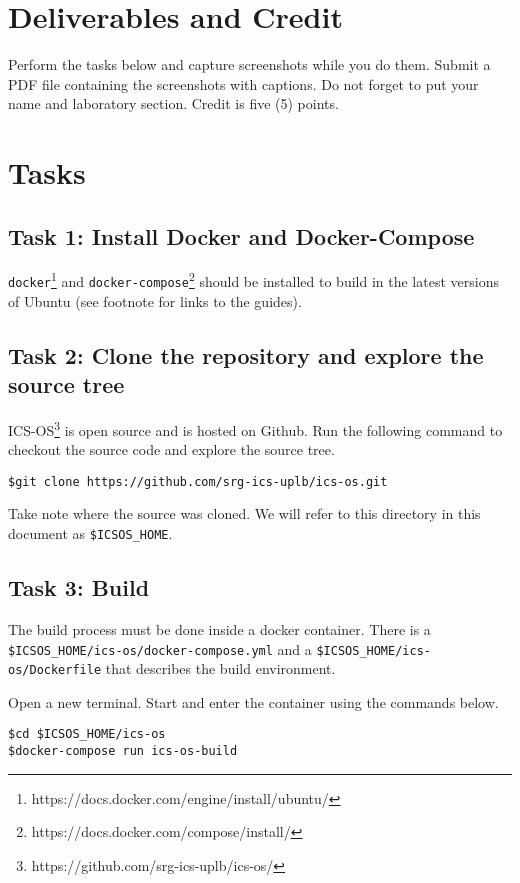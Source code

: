\documentclass[a4paper, 11pt,oneside]{article}
\begin{document}
\section{Deliverables and Credit}
Perform the tasks below and capture screenshots while you do them. Submit a PDF 
file containing the screenshots with captions. Do not forget to put your name 
and laboratory section. Credit is five (5) points.

\section{Tasks}

\subsection*{Task 1: Install Docker and Docker-Compose}
\texttt{docker}\footnote{https://docs.docker.com/engine/install/ubuntu/} and 
\texttt{docker-compose}\footnote{https://docs.docker.com/compose/install/} 
should be installed to build in the latest versions of Ubuntu (see footnote for 
links to the guides). 


\subsection*{Task 2: Clone the repository and explore the source tree}
ICS-OS\footnote{https://github.com/srg-ics-uplb/ics-os/} is open source and is 
hosted on Github. Run the following command to checkout the source code and 
explore the source tree.

\begin{verbatim}
$git clone https://github.com/srg-ics-uplb/ics-os.git
\end{verbatim}

Take note where the source was cloned. We will refer to this directory in 
this document as \texttt{\$ICSOS\_HOME}.

\subsection*{Task 3: Build}
The build process must be done inside a docker container. There is a 
\texttt{\$ICSOS\_HOME/ics-os/docker-compose.yml} and a 
\texttt{\$ICSOS\_HOME/ics-os/Dockerfile} that describes the build environment.

Open a new terminal. Start and enter the container using the commands below.

\begin{verbatim}
$cd $ICSOS_HOME/ics-os
$docker-compose run ics-os-build
\end{verbatim}
\end{document}
